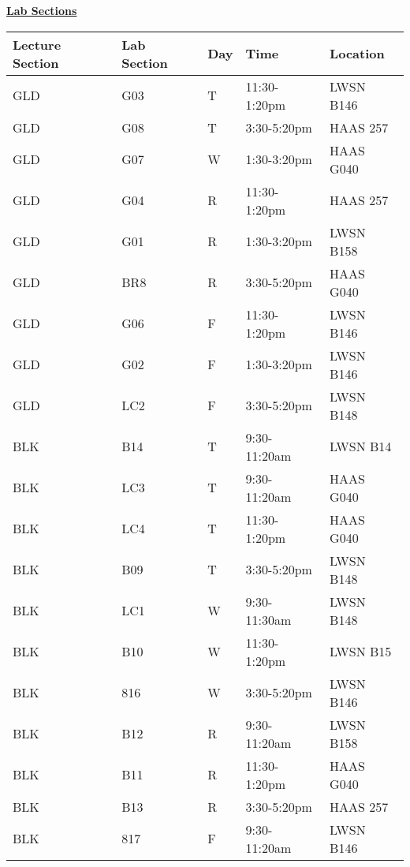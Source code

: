\documentclass[CS180-S16-FinalExam.tex]{subfiles}
\begin{document}
 
\begin{center}
\textbf{\underline{\Huge{Lab Sections}}}
\end{center}
\begin{table}[!htb]
\renewcommand{\arraystretch}{2}
\centering
\begin{tabular}{|l|l|l|l|l|}\hline 
\textbf{Lecture Section} & \textbf{Lab Section} & \textbf{Day} & \textbf{Time} & \textbf{Location} \\ \hline
GLD & G03 & T & 11:30-1:20pm &  LWSN B146 \\ \hline
GLD & G08 & T & 3:30-5:20pm & HAAS 257 \\ \hline
GLD & G07 & W & 1:30-3:20pm & HAAS G040 \\ \hline
GLD & G04 & R & 11:30-1:20pm & HAAS 257 \\ \hline
GLD & G01 & R & 1:30-3:20pm & LWSN B158 \\ \hline
GLD & BR8 & R & 3:30-5:20pm & HAAS G040 \\ \hline
GLD & G06 & F & 11:30-1:20pm & LWSN B146 \\ \hline
GLD & G02 & F & 1:30-3:20pm & LWSN B146 \\ \hline
GLD & LC2 & F & 3:30-5:20pm & LWSN B148 \\ \hline
BLK & B14 & T & 9:30-11:20am & LWSN B14 \\ \hline
BLK & LC3 & T & 9:30-11:20am & HAAS G040 \\ \hline
BLK & LC4 & T & 11:30-1:20pm & HAAS G040 \\ \hline
BLK & B09 & T & 3:30-5:20pm & LWSN B148 \\ \hline
BLK & LC1 & W & 9:30-11:30am & LWSN B148 \\ \hline 
BLK & B10 & W & 11:30-1:20pm & LWSN B15 \\ \hline
BLK & 816 & W & 3:30-5:20pm & LWSN B146 \\ \hline
BLK & B12 & R & 9:30-11:20am & LWSN B158 \\ \hline 
BLK & B11 & R & 11:30-1:20pm & HAAS G040 \\ \hline
BLK & B13 & R & 3:30-5:20pm & HAAS 257 \\ \hline
BLK & 817 & F & 9:30-11:20am & LWSN B146 \\ \hline 
\end{tabular}
\end{table}
\end{document}
